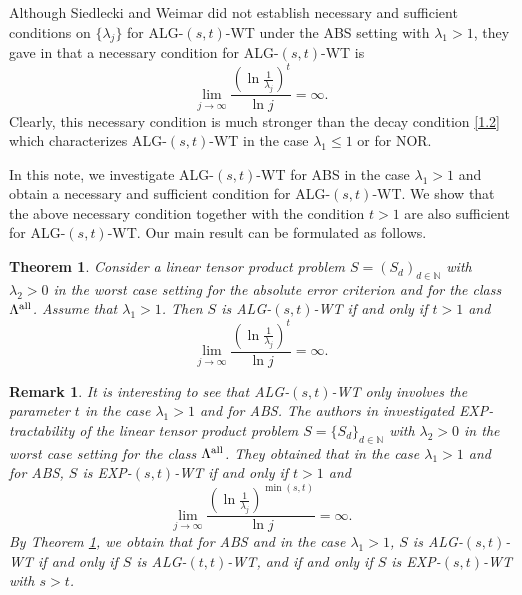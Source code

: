 \documentclass{amsart}
\newtheorem{thm}{Theorem}[section]
\newtheorem{rem}{Remark}
\numberwithin{equation}{section}
\def\lz{\lambda}
\newcommand{\NN}{\mathbb{N}}
\def\NN{{\mathbb N}}
\begin{document}
Although Siedlecki and
Weimar did not establish necessary and sufficient conditions on
 $\{\lz_j\}$ for ALG-$(s,t)$-WT under the ABS setting with $\lz_1>1$, they
 gave in \cite[Lemma 3.12]{SW15} that  a necessary condition for ALG-$(s,t)$-WT is
\begin{equation*}
\lim_{j\rightarrow\infty}\frac{(\ln\frac{1}{\lambda_j})^t}{\ln
j}=\infty.
\end{equation*}
Clearly, this necessary condition is much stronger than the decay
condition \eqref{1.2} which characterizes ALG-$(s,t)$-WT in the
case $\lz_1\le1$ or for NOR.

In  this note, we investigate ALG-$(s,t)$-WT for ABS in the case
$\lz_1>1$ and obtain a necessary and sufficient condition for
 ALG-$(s,t)$-WT. We show that  the above necessary condition
 together with
 the condition $t>1$ are also sufficient for ALG-$(s,t)$-WT. Our
 main result can be formulated as follows.







\begin{thm}\label{thm1} Consider a linear tensor product problem $S=(S_d)_{d\in\NN}$ with $\lambda_2>0$ in the
worst case setting for the absolute error criterion and for the
class $\Lambda^{\rm all}$.
 Assume that $\lambda_1>1$. Then $S$ is ALG-$(s,t)$-WT if and only if
 $t>1$ and
\begin{equation}\label{1.3}
\lim_{j\rightarrow\infty}\frac{(\ln\frac{1}{\lambda_j})^t}{\ln
j}=\infty.
\end{equation}
\end{thm}

\begin{rem}It is interesting
to see that ALG-$(s,t)$-WT only involves the parameter $t$ in the
case $\lz_1>1$ and for ABS. The authors in \cite{PPW17}
investigated EXP-tractability of the linear tensor product problem
 $S=\{S_d\}_{d\in\NN}$ with $\lambda_2>0$ in the
worst case setting  for the class $\Lambda^{\rm all}$. They
obtained that in the case $\lz_1> 1$ and for ABS, $S$ is
EXP-$(s,t)$-WT if and only if $t>1$ and
\begin{equation*}
\lim_{j\rightarrow\infty}\frac{(\ln\frac{1}{\lambda_j})^{\min(s,t)}}{\ln
j}=\infty.
\end{equation*}By Theorem \ref{thm1}, we obtain that  for ABS and in the case $\lz_1> 1$, $S$ is
ALG-$(s,t)$-WT if and only if  $S$ is ALG-$(t,t)$-WT, and  if and
only if  $S$ is EXP-$(s,t)$-WT with $s>t$.
\end{rem}
\end{document}

